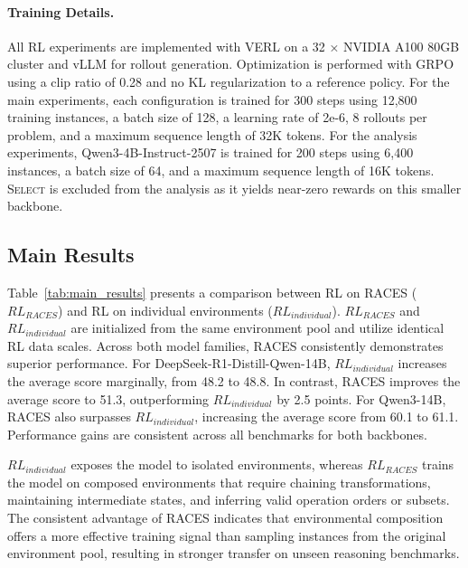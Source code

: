 \paragraph{Training Details.}
All RL experiments are implemented with VERL on a 32 × NVIDIA A100 80GB cluster and vLLM for rollout generation. Optimization is performed with GRPO~\citep{shao2024deepseekmathpushinglimitsmathematical} using a clip ratio of 0.28 and no KL regularization to a reference policy. For the main experiments, each configuration is trained for 300 steps using 12,800 training instances, a batch size of 128, a learning rate of 2e-6, 8 rollouts per problem, and a maximum sequence length of 32K tokens. For the analysis experiments, Qwen3-4B-Instruct-2507 is trained for 200 steps using 6,400 instances, a batch size of 64, and a maximum sequence length of 16K tokens. \textsc{Select} is excluded from the analysis as it yields near-zero rewards on this smaller backbone.

\subsection{Main Results}
\label{sec:main_results}


Table~\ref{tab:main_results} presents a comparison between RL on RACES ($RL_{RACES}$) and RL on individual environments ($RL_{individual}$).
$RL_{RACES}$ and $RL_{individual}$ are initialized from the same environment pool and utilize identical RL data scales.
Across both model families, RACES consistently demonstrates superior performance.
For DeepSeek-R1-Distill-Qwen-14B, $RL_{individual}$ increases the average score marginally, from 48.2 to 48.8.
In contrast, RACES improves the average score to 51.3, outperforming $RL_{individual}$ by 2.5 points.
For Qwen3-14B, RACES also surpasses $RL_{individual}$, increasing the average score from 60.1 to 61.1.
Performance gains are consistent across all benchmarks for both backbones.

$RL_{individual}$ exposes the model to isolated environments, whereas $RL_{RACES}$ trains the model on composed environments that require chaining transformations, maintaining intermediate states, and inferring valid operation orders or subsets.
The consistent advantage of RACES indicates that environmental composition offers a more effective training signal than sampling instances from the original environment pool, resulting in stronger transfer on unseen reasoning benchmarks.